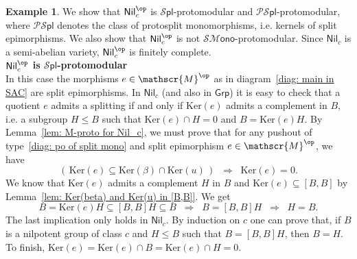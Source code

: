 \documentclass[11pt]{amsart}
\theoremstyle{plain}
\theoremstyle{definition}
\newtheorem{example}[subsection]{Example}
\theoremstyle{remark}
\newcommand{\To}{\Rightarrow}
\newcommand{\Grp}{\ensuremath{\mathsf{Grp}}}
\newcommand{\Nil}{\ensuremath{\mathsf{Nil}}}
\newcommand{\M}{\ensuremath{\mathscr{M}}}
\newcommand{\SMono}{\ensuremath{\mathscr{SM}\mathsf{ono}}}
\newcommand{\Spl}{\ensuremath{\mathscr{S}\mathsf{pl}}}
\newcommand{\PSpl}{\ensuremath{\mathscr{PS}\mathsf{pl}}}
\newcommand{\Ker}{\ensuremath{\mathrm{Ker}}}
\begin{document}
\begin{example}\label{ex: Nil_c^op} We show that $\Nil_c^\op$ is $\Spl$-protomodular and $\PSpl$-protomodular, where $\PSpl$ denotes the class of protosplit monomorphisms, i.e. kernels of split epimorphisms. We also show that $\Nil_c^\op$ is not $\SMono$-protomodular. Since $\Nil_c$ is a semi-abelian variety, $\Nil_c^\op$ is finitely complete.\\
\noindent\textbf{$\Nil_c^\op$ is $\Spl$-protomodular}\\
In this case the morphisms $e\in\M^\op$ as in diagram~\eqref{diag: main in SAC} are split epimorphisms. In $\Nil_c$ (and also in $\Grp$) it is easy to check that a quotient $e$ admits a splitting if and only if $\Ker(e)$ admits a complement in $B$, i.e. a subgroup $H\le B$ such that $\Ker(e)\cap H=0$ and $B=\Ker(e)H$.  By Lemma~\ref{lem: M-proto for Nil_c}, we must prove that for any pushout of type~\eqref{diag: po of split mono} and split epimorphism $e\in \M^\op$, we have
\[
	\left( \,\Ker(e) \subseteq \Ker(\beta)\cap \Ker(u) \,\right) \;\;\To\;\; \Ker(e)=0.
\]
We know that $\Ker(e)$ admits a complement $H$ in $B$ and $\Ker(e) \subseteq [B,B]$ by Lemma~\ref{lem: Ker(beta) and Ker(u) in [B,B]}. We get
\[
	B=\Ker(e)H\subseteq [B,B]H\subseteq B \;\; \To\;\; B=[B,B]H \;\; \To\;\; H=B.
\]
The last implication only holds in $\Nil_c$. By induction on $c$ one can prove that, if $B$ is a nilpotent group of class $c$ and $H\le B$ such that $B=[B,B]H$, then $B=H$. To finish, $\Ker(e)=\Ker(e)\cap B=\Ker(e)\cap H=0$.


\end{example}
\end{document}

